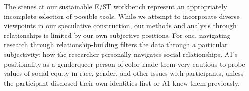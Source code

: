 \documentclass[manuscript,review,anonymous]{acmart}
\begin{document}
The scenes at our sustainable E/ST workbench represent an appropriately incomplete selection of possible tools. While we attempt to incorporate diverse viewpoints in our speculative construction, our methods and analysis through relationships is limited by our own subjective positions.
For one, navigating research through relationship-building filters the data through a particular subjectivity: how the researcher personally navigates social relationships. A1's positionality as a genderqueer person of color made them very cautious to probe values of social equity in race, gender, and other issues with participants, unless the participant disclosed their own identities first or A1 knew them previously.
\end{document}

